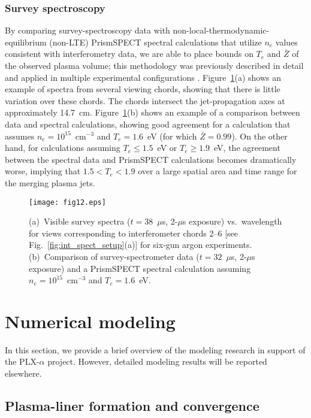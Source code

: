 \documentclass[journal]{IEEEtran}
\begin{document}
\subsubsection{Survey spectroscopy}
By comparing survey-spectroscopy data with non-local-thermodynamic-equilibrium (non-LTE)
PrismSPECT \cite{macfarlane03} spectral calculations that
utilize $n_e$ values consistent with interferometry data, we are able
to place bounds on $T_e$ and $\bar{Z}$ of the observed plasma volume; this methodology was previously
described in detail \cite{hsu12pop} and applied in
multiple experimental configurations \cite{hsu12pop,merritt13, merritt14, moser15pop,
adams15pre}.  Figure~\ref{fig:ss_data}(a) shows an example
of spectra from several viewing chords, showing that there is little variation over these chords.
The chords intersect the jet-propagation axes at approximately 14.7~cm.
Figure~\ref{fig:ss_data}(b) shows an example of a
comparison between data and spectral calculations, showing
good agreement for a calculation that assumes $n_e = 10^{15}$~cm$^{-3}$
and $T_e=1.6$~eV (for which $\bar{Z}=0.99$).  On
the other hand, for calculations assuming $T_e \le 1.5$~eV
or $T_e \ge 1.9$~eV, the agreement between the spectral data and 
PrismSPECT calculations becomes dramatically worse,
implying that $1.5 < T_e < 1.9$ over a large spatial area and time range for the merging
plasma jets.

\begin{figure}[!tb]
\centering
\texttt{[image: fig12.eps]}
\caption{(a)~Visible survey spectra ($t=38$~$\mu$s, 2-$\mu$s exposure)
vs.\ wavelength for views corresponding
to interferometer chords 2--6 [see Fig.~\ref{fig:int_spect_setup}(a)] for six-gun argon experiments.
(b)~Comparison of survey-spectrometer data ($t=32$~$\mu$s, 2-$\mu$s exposure)
and a PrismSPECT spectral calculation assuming
$n_e = 10^{15}$~cm$^{-3}$ and $T_e= 1.6$~eV\@.}
\label{fig:ss_data}
\end{figure}

\section{Numerical modeling}
\label{sec:modeling}

In this section, we provide a brief overview of the modeling research
in support of the PLX-$\alpha$ project.
However, detailed modeling results will be reported elsewhere.

\subsection{Plasma-liner formation and convergence}
\label{sec:modeling1}
\end{document}
